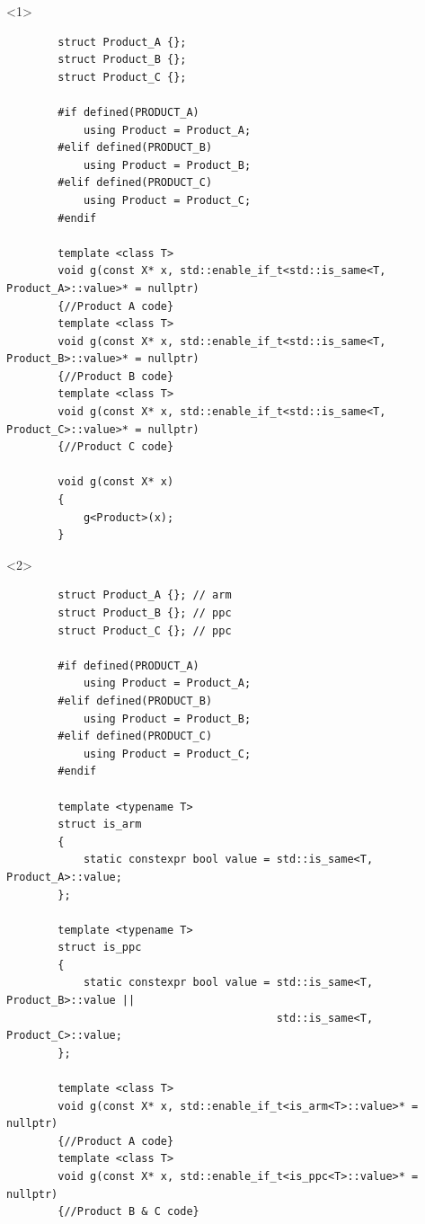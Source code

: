 \documentclass{beamer}
\begin{document}
\begin{frame}[fragile,t]
    \begin{onlyenv}<1>
    \begin{lstlisting}
        struct Product_A {};
        struct Product_B {};
        struct Product_C {};

        #if defined(PRODUCT_A)
            using Product = Product_A;
        #elif defined(PRODUCT_B)
            using Product = Product_B;
        #elif defined(PRODUCT_C)
            using Product = Product_C;
        #endif

        template <class T>
        void g(const X* x, std::enable_if_t<std::is_same<T, Product_A>::value>* = nullptr)
        {//Product A code}
        template <class T>
        void g(const X* x, std::enable_if_t<std::is_same<T, Product_B>::value>* = nullptr)
        {//Product B code}
        template <class T>
        void g(const X* x, std::enable_if_t<std::is_same<T, Product_C>::value>* = nullptr)
        {//Product C code}
        
        void g(const X* x)
        {
            g<Product>(x); 
        }
    \end{lstlisting}
    \end{onlyenv}

    \begin{onlyenv}<2>
    \begin{lstlisting}
        struct Product_A {}; // arm
        struct Product_B {}; // ppc
        struct Product_C {}; // ppc

        #if defined(PRODUCT_A)
            using Product = Product_A;
        #elif defined(PRODUCT_B)
            using Product = Product_B;
        #elif defined(PRODUCT_C)
            using Product = Product_C;
        #endif

        template <typename T>
        struct is_arm
        {
            static constexpr bool value = std::is_same<T, Product_A>::value;
        };

        template <typename T>
        struct is_ppc
        {
            static constexpr bool value = std::is_same<T, Product_B>::value ||
                                          std::is_same<T, Product_C>::value;
        };

        template <class T>
        void g(const X* x, std::enable_if_t<is_arm<T>::value>* = nullptr)
        {//Product A code}
        template <class T>
        void g(const X* x, std::enable_if_t<is_ppc<T>::value>* = nullptr)
        {//Product B & C code}
        

\end{lstlisting}
\end{onlyenv}
\end{frame}
\end{document}
